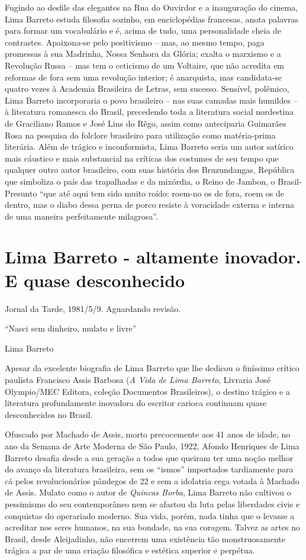 \documentclass[
  letterpaper,
  DIV=11,
  numbers=noendperiod]{scrreprt}
\begin{document}
Fugindo ao desfile das elegantes na Rua do Ouvirdor e a inauguração do
cinema, Lima Barreto estuda filosofia sozinho, em enciclopédias
francesas, anota palavras para formar um vocabulário e é, acima de tudo,
uma personalidade cheia de contrastes. Apaixona-se pelo positivismo --
mas, ao mesmo tempo, paga promessas à sua Madrinha, Nossa Senhora da
Glória; exalta o marxismo e a Revolução Russa -- mas tem o ceticismo de
um Voltaire, que não acredita em reformas de fora sem uma revolução
interior; é anarquista, mas candidata-se quatro vezes à Academia
Brasileira de Letras, sem sucesso. Sensível, polêmico, Lima Barreto
incorporaria o povo brasileiro -- nas suas camadas mais humildes -- à
literatura romanesca do Brasil, precedendo toda a literatura social
nordestina de Graciliano Ramos e José Lins do Rêgo, assim como
anteciparia Guimarães Rosa na pesquisa do folclore brasileiro para
utilização como matéria-prima literária. Além de trágico e
inconformista, Lima Barreto seria um autor satírico mais cáustico e mais
substancial na críticas dos costumes de seu tempo que qualquer outro
autor brasileiro, com suas história dos Bruzundangas, República que
simboliza o país das trapalhadas e da mixórdia, o Reino de Jambon, o
Brasil-Presunto ``que até aqui tem sido muito roído: roem-no os de fora,
roem os de dentro, mas o diabo dessa perna de porco resiste à voracidade
externa e interna de uma maneira perfeitamente milagrosa''.

\chapter{Lima Barreto - altamente inovador. E quase
desconhecido}\label{lima-barreto---altamente-inovador.-e-quase-desconhecido}

Jornal da Tarde, 1981/5/9. Aguardando revisão.

\hfill\break

``Nasci sem dinheiro, mulato e livre''

Lima Barreto

Apesar da excelente biografia de Lima Barreto que lhe dedicou o
finíssimo crítico paulista Francisco Assis Barbosa (\emph{A Vida de Lima
Barreto}, Livraria José Olympio/MEC Editora, coleção Documentos
Brasileiros), o destino trágico e a literatura profundamente inovadora
do escritor carioca continuam quase desconhecidos no Brasil.

Ofuscado por Machado de Assis, morto precocemente aos 41 anos de idade,
no ano da Semana de Arte Moderna de São Paulo, 1922, Afondo Henriques de
Lima Barreto desafia desde a sua geração a todos que queiram ter uma
noção melhor do avanço da literatura brasileira, sem os ``ismos''
importados tardiamente para cá pelos revolucionários pândegos de 22 e
sem a idolatria cega votada à Machado de Assis. Mulato como o autor de
\emph{Quincas Borba}, Lima Barreto não cultivou o pessimismo do seu
contemporâneo nem se afastou da luta pelas liberdades civis e conquistas
do operariado moderno. Sua vida, porém, nada tinha que o levasse a
acreditar nos seres humanos, na sua bondade, na sua coragem. Talvez as
artes no Brasil, desde Aleijadinho, não encerrem uma existência tão
monstruosamente trágica a par de uma criação filosófica e estética
superior e perpétua.
\end{document}
